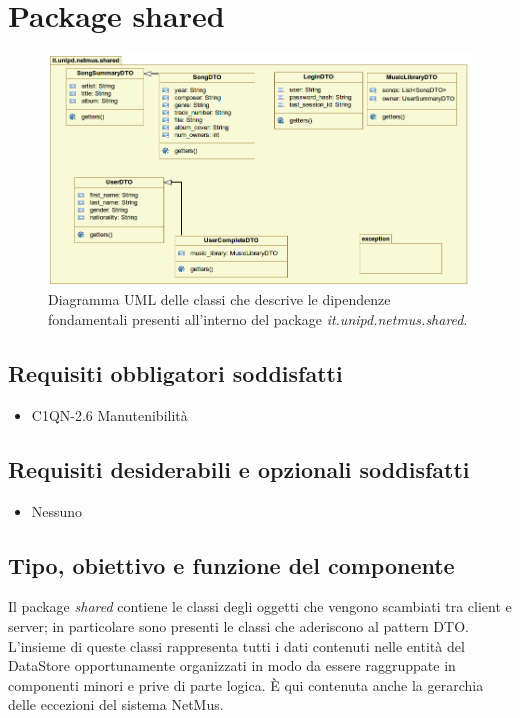 \newpage
\section{Package shared}

\begin{figure}[!h]
  \centering
  \includegraphics[width=15cm]{img/DP/classes_shared.png}
\caption{Diagramma UML delle classi che descrive le dipendenze
fondamentali presenti all'interno del package
\emph{it.unipd.netmus.shared}.}
\end{figure}

\subsection*{Requisiti obbligatori soddisfatti}
\begin{itemize}
  	\item C1QN-2.6 Manutenibilit\`a
\end{itemize}
\subsection*{Requisiti desiderabili e opzionali soddisfatti}
\begin{itemize}
    \item Nessuno
\end{itemize}
\subsection*{Tipo, obiettivo e funzione del componente}
Il package \emph{shared} contiene le classi degli oggetti che vengono
scambiati tra client e server; in particolare sono presenti le classi che
aderiscono al pattern DTO. L'insieme di queste classi rappresenta tutti i
dati contenuti nelle entit\`a del DataStore opportunamente organizzati in modo
da essere raggruppate in componenti minori e prive di parte logica.
\`E qui contenuta anche la gerarchia delle eccezioni del sistema NetMus.
